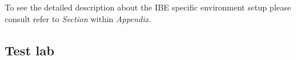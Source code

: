 


To see the detailed description about the IBE specific environment setup
please consult refer to \textit{Section } within \textit{Appendix}.

\subsection{Test lab}







